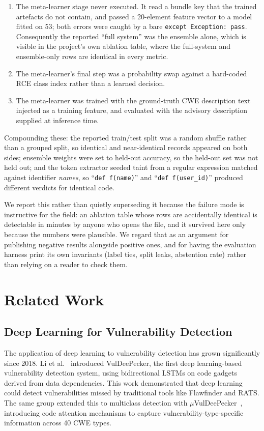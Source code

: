 \documentclass[12pt,a4paper]{article}
\begin{document}
\begin{enumerate}
    \item The meta-learner stage never executed. It read a bundle key that the trained artefacts do not contain, and passed a 20-element feature vector to a model fitted on 53; both errors were caught by a bare \texttt{except Exception: pass}. Consequently the reported ``full system'' was the ensemble alone, which is visible in the project's own ablation table, where the full-system and ensemble-only rows are identical in every metric.
    \item The meta-learner's final step was a probability swap against a hard-coded RCE class index rather than a learned decision.
    \item The meta-learner was trained with the ground-truth CWE description text injected as a training feature, and evaluated with the advisory description supplied at inference time.
\end{enumerate}

Compounding these: the reported train/test split was a random shuffle rather than a grouped split, so identical and near-identical records appeared on both sides; ensemble weights were set to held-out accuracy, so the held-out set was not held out; and the token extractor seeded taint from a regular expression matched against identifier \emph{names}, so ``\texttt{def f(name)}'' and ``\texttt{def f(user\_id)}'' produced different verdicts for identical code.

We report this rather than quietly superseding it because the failure mode is instructive for the field: an ablation table whose rows are accidentally identical is detectable in minutes by anyone who opens the file, and it survived here only because the numbers were plausible. We regard that as an argument for publishing negative results alongside positive ones, and for having the evaluation harness print its own invariants (label ties, split leaks, abstention rate) rather than relying on a reader to check them.

\section{Related Work}
\label{sec:related}

\subsection{Deep Learning for Vulnerability Detection}

The application of deep learning to vulnerability detection has grown significantly since 2018. Li et al.~\cite{li2018vuldeepecker} introduced VulDeePecker, the first deep learning-based vulnerability detection system, using bidirectional LSTMs on code gadgets derived from data dependencies. This work demonstrated that deep learning could detect vulnerabilities missed by traditional tools like Flawfinder and RATS. The same group extended this to multiclass detection with $\mu$VulDeePecker~\cite{zou2019muVulDeePecker}, introducing code attention mechanisms to capture vulnerability-type-specific information across 40 CWE types.
\end{document}
